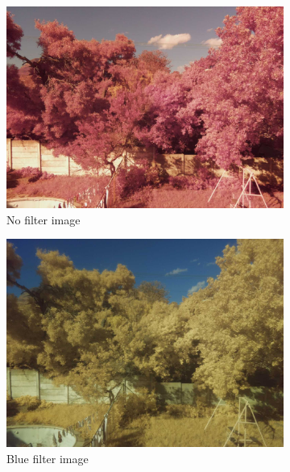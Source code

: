 \begin{appendices}
\begin{figure}[H]
\begin{subfigure}{0.5\textwidth}
\centering
\includegraphics[scale=0.2]{filter/noir.jpg}
\caption{No filter image}
\end{subfigure}
\begin{subfigure}{0.5\textwidth}
\centering
\includegraphics[scale=0.17]{filter/blue_ir.jpg}
\caption{Blue filter image}
\end{subfigure}
\begin{subfigure}{0.5\textwidth}
\centering

\end{subfigure}
\end{figure}
\end{appendices}
